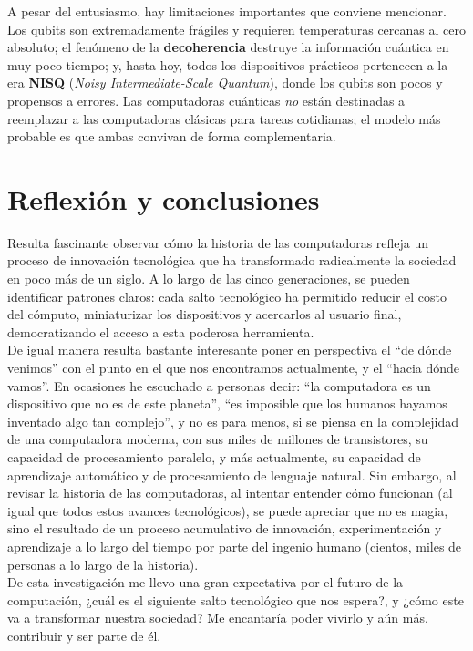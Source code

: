 \documentclass[10pt,letterpaper,twocolumn]{article}
\begin{document}
A pesar del entusiasmo, hay limitaciones importantes que conviene
mencionar. Los qubits son extremadamente frágiles y requieren
temperaturas cercanas al cero absoluto; el fenómeno de la
\textbf{decoherencia} destruye la información cuántica en muy poco
tiempo; y, hasta hoy, todos los dispositivos prácticos pertenecen a la
era \textbf{NISQ} (\emph{Noisy Intermediate-Scale Quantum}), donde los
qubits son pocos y propensos a errores. Las computadoras cuánticas
\emph{no} están destinadas a reemplazar a las computadoras clásicas
para tareas cotidianas; el modelo más probable es que ambas convivan
de forma complementaria.

\section{Reflexión y conclusiones}

Resulta fascinante observar cómo la historia de las computadoras refleja un 
proceso de innovación tecnológica que ha transformado radicalmente la sociedad 
en poco más de un siglo. 
A lo largo de las cinco generaciones, se pueden identificar patrones claros: 
cada salto tecnológico ha permitido reducir el costo del cómputo, miniaturizar 
los dispositivos y acercarlos al usuario final, democratizando el acceso a esta 
poderosa herramienta. \\
De igual manera resulta bastante interesante poner en perspectiva el ``de dónde 
venimos'' con el punto en el que nos encontramos actualmente, y el ``hacia dónde 
vamos''.
En ocasiones he escuchado a personas decir: ``la computadora es un dispositivo 
que no es de este planeta'', ``es imposible que los humanos hayamos inventado algo
tan complejo'', y no es para menos, si se piensa en la complejidad de una 
computadora moderna, con sus miles de millones de transistores, su capacidad 
de procesamiento paralelo, y más actualmente, su capacidad de aprendizaje 
automático y de procesamiento de lenguaje natural. Sin embargo, al revisar la 
historia de las computadoras, al intentar entender cómo funcionan (al igual
que todos estos avances tecnológicos), se puede apreciar que no es magia, sino 
el resultado de un proceso acumulativo de innovación, experimentación y 
aprendizaje a lo largo del tiempo por parte del ingenio humano (cientos, miles 
de personas a lo largo de la historia). \\
De esta investigación me llevo una gran expectativa por el futuro de la 
computación, ¿cuál es el siguiente salto tecnológico que nos espera?, y 
¿cómo este va a transformar nuestra sociedad? Me encantaría poder vivirlo y 
aún más, contribuir y ser parte de él.
\end{document}
